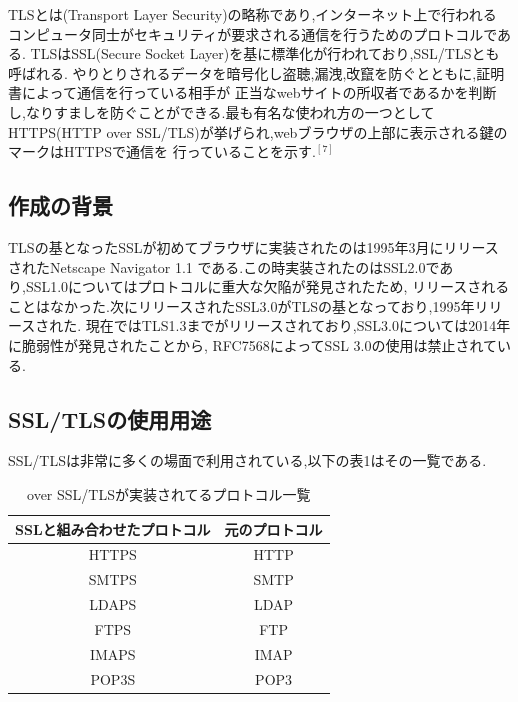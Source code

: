 \documentclass[dvipdfmx,autodetect-engine,titlepage]{jsarticle}
\begin{document}
TLSとは(Transport Layer Security)の略称であり,インターネット上で行われる
コンピュータ同士がセキュリティが要求される通信を行うためのプロトコルである.
TLSはSSL(Secure Socket Layer)を基に標準化が行われており,SSL/TLSとも呼ばれる.
やりとりされるデータを暗号化し盗聴,漏洩,改竄を防ぐとともに,証明書によって通信を行っている相手が
正当なwebサイトの所収者であるかを判断し,なりすましを防ぐことができる.最も有名な使われ方の一つとして
HTTPS(HTTP over SSL/TLS)が挙げられ,webブラウザの上部に表示される鍵のマークはHTTPSで通信を
行っていることを示す.\begin{math}^{[7]}\end{math}

\subsection{作成の背景}

TLSの基となったSSLが初めてブラウザに実装されたのは1995年3月にリリースされたNetscape Navigator 1.1
である.この時実装されたのはSSL2.0であり,SSL1.0についてはプロトコルに重大な欠陥が発見されたため,
リリースされることはなかった.次にリリースされたSSL3.0がTLSの基となっており,1995年リリースされた.
現在ではTLS1.3までがリリースされており,SSL3.0については2014年に脆弱性が発見されたことから,
RFC7568によってSSL 3.0の使用は禁止されている.

\subsection{SSL/TLSの使用用途}

SSL/TLSは非常に多くの場面で利用されている,以下の表1はその一覧である.

\begin{table}[h]
  \centering
  \caption{over SSL/TLSが実装されてるプロトコル一覧}
  \begin{tabular}{|c|c|}
  \hline
  SSLと組み合わせたプロトコル & 元のプロトコル \\ \hline \hline
  HTTPS           & HTTP    \\ \hline
  SMTPS           & SMTP    \\ \hline
  LDAPS           & LDAP    \\ \hline
  FTPS            & FTP     \\ \hline
  IMAPS           & IMAP    \\ \hline
  POP3S           & POP3    \\ \hline
  \end{tabular}
\end{table}
\end{document}

